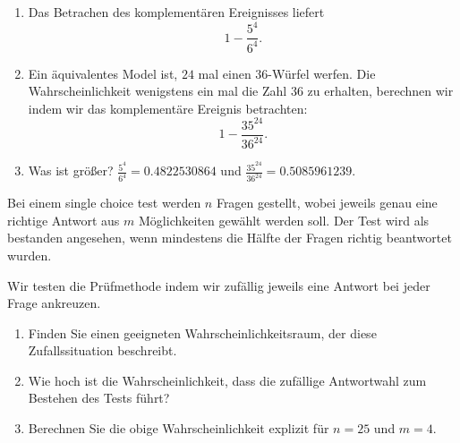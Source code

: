 \solution
\begin{enumerate}
    \item Das Betrachen des komplementären Ereignisses liefert
        \begin{equation*}
            1 - \frac{5^4}{6^4}.
        \end{equation*}
    \item Ein äquivalentes Model ist, $24$ mal einen $36$-Würfel werfen. Die
        Wahrscheinlichkeit wenigstens ein mal die Zahl $36$ zu erhalten,
        berechnen wir indem wir das komplementäre Ereignis betrachten:
        \begin{equation*} 
            1 - \frac{35^{24}}{36^{24}}.  
        \end{equation*}
    \item Was ist größer? $\frac{5^4}{6^4} = 0.4822530864$ und
        $\frac{35^{24}}{36^{24}} = 0.5085961239$.

\end{enumerate}




 Bei einem single choice test
werden $n$ Fragen gestellt, wobei jeweils genau eine richtige Antwort aus $m$
Möglichkeiten gewählt werden soll. Der Test wird als bestanden angesehen, wenn
mindestens die Hälfte der Fragen richtig beantwortet wurden.

Wir testen die Prüfmethode indem wir zufällig jeweils eine Antwort bei jeder Frage
ankreuzen. 
\begin{enumerate}
    \item Finden Sie einen geeigneten Wahrscheinlichkeitsraum, der diese
        Zufallssituation \linebreak beschreibt.
    \item Wie hoch ist die Wahrscheinlichkeit, dass die zufällige Antwortwahl zum 
        Bestehen des Tests führt?
    \item Berechnen Sie die obige Wahrscheinlichkeit explizit für $n=25$ und $m=4$.
\end{enumerate}

